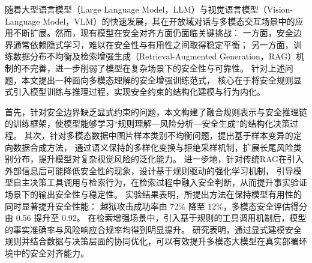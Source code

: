 
\begin{cabstract}
随着大型语言模型（Large Language Model，LLM）与视觉语言模型（Vision-Language Model，VLM）的快速发展，其在开放域对话与多模态交互场景中的应用不断扩展。然而，现有模型在安全对齐方面仍面临关键挑战：
一方面，安全边界通常依赖隐式学习，难以在安全性与有用性之间取得稳定平衡；
另一方面，训练数据分布不均衡及检索增强生成（Retrieval-Augmented Generation，RAG）机制的不完善，进一步削弱了模型在复杂场景下的安全性与可靠性。
针对上述问题，本文提出一种面向多模态理解的安全增强训练范式，
核心在于将安全规则显式引入模型训练与推理过程，实现安全约束的结构化建模与行为内化。

首先，针对安全边界缺乏显式约束的问题，本文构建了融合规则表示与安全推理链的训练框架，使模型能够学习“规则理解—风险分析—安全生成”的结构化决策过程。
其次，针对多模态数据中图片样本类别不均衡问题，提出基于样本变异的定向数据合成方法，
通过语义保持的多样化变换与拒绝采样机制，扩展长尾风险类别分布，提升模型对复杂视觉风险的泛化能力。
进一步地，针对传统RAG在引入外部信息后可能降低安全性的现象，设计基于规则驱动的强化学习机制，
引导模型自主决策工具调用与检索行为，在检索过程中融入安全判断，从而提升事实验证场景下的输出安全性与稳定性。
实验结果表明，所提出方法在保持模型有用性的同时显著提升安全性能：
越狱攻击成功率由 72\% 降至 12\%，多模态安全评估得分由 0.56 提升至 0.92。
在检索增强场景中，引入基于规则的工具调用机制后，模型的事实准确率与风险响应合规率均得到明显提升。
研究表明，通过显式建模安全规则并结合数据与决策层面的协同优化，可以有效提升多模态大模型在真实部署环境中的安全对齐能力。

\end{cabstract}

